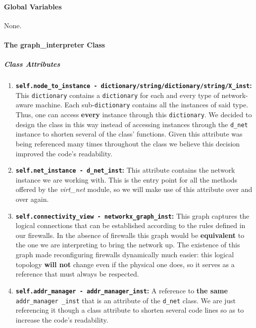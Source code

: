     \paragraph{Global Variables}
        None.

    \paragraph{The graph\_interpreter Class}
        \subparagraph{Class Attributes}
            \begin{enumerate}
                \item \textbf{\texttt{self.node\_to\_instance - dictionary/string/dictionary/string/X\_inst}:} This \texttt{dictionary} contains a \texttt{dictionary} for each and every type of network-aware machine. Each sub-\texttt{dictionary} contains all the instances of said type. Thus, one can access \textbf{every} instance through this \texttt{dictionary}. We decided to design the class in this way instead of accessing instances through the \texttt{d\_net} instance to shorten several of the class' functions. Given this attribute was being referenced many times throughout the class we believe this decision improved the code's readability.
                \item \textbf{\texttt{self.net\_instance - d\_net\_inst}:} This attribute contains the network instance we are working with. This is the entry point for all the methods offered by the \textit{virt\_net} module, so we will make use of this attribute over and over again.
                \item \textbf{\texttt{self.connectivity\_view - networkx\_graph\_inst}:}  This graph captures the logical connections that can be established according to the rules defined in our firewalls. In the absence of firewalls this graph would be \textbf{equivalent} to the one we are interpreting to bring the network up. The existence of this graph made reconfiguring firewalls dynamically much easier: this logical topology \textbf{will not} change even if the physical one does, so it serves as a reference that must always be respected.
                \item \textbf{\texttt{self.addr\_manager - addr\_manager\_inst}:} A reference to \textbf{the same} \texttt{addr\_manager \_inst} that is an attribute of the \texttt{d\_net} class. We are just referencing it though a class attribute to shorten several code lines so as to increase the code's readability.
            \end{enumerate}

